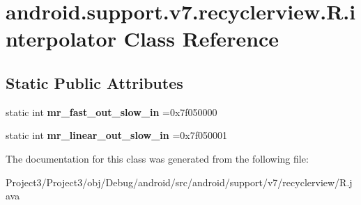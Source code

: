 \hypertarget{classandroid_1_1support_1_1v7_1_1recyclerview_1_1R_1_1interpolator}{}\section{android.\+support.\+v7.\+recyclerview.\+R.\+interpolator Class Reference}
\label{classandroid_1_1support_1_1v7_1_1recyclerview_1_1R_1_1interpolator}
\subsection*{Static Public Attributes}
\begin{DoxyCompactItemize}
\item 
\mbox{\label{classandroid_1_1support_1_1v7_1_1recyclerview_1_1R_1_1interpolator_a72e60268c3042dc618b690cd49b2e1e4}} 
static int {\bfseries mr\+\_\+fast\+\_\+out\+\_\+slow\+\_\+in} =0x7f050000
\item 
\mbox{\label{classandroid_1_1support_1_1v7_1_1recyclerview_1_1R_1_1interpolator_a1ae867653f77953d90e869030a24a877}} 
static int {\bfseries mr\+\_\+linear\+\_\+out\+\_\+slow\+\_\+in} =0x7f050001
\end{DoxyCompactItemize}


The documentation for this class was generated from the following file\+:\begin{DoxyCompactItemize}
\item 
Project3/\+Project3/obj/\+Debug/android/src/android/support/v7/recyclerview/R.\+java\end{DoxyCompactItemize}
